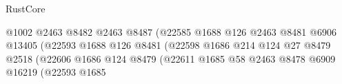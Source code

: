 \begin{lexlean}{RustCore}
\begin{coremodule}
                                                              @1002
                                                              @2463
                                                              @8482
                                                              @2463
                                                              @8487
                                                              (@22585
                                                                @1688
                                                                @126
                                                                @2463
                                                                @8481
                                                                @6906
                                                                @13405
                                                                (@22593
                                                                  @1688
                                                                  @126
                                                                  @8481
                                                                  (@22598
                                                                    @1686
                                                                    @214
                                                                    @124
                                                                    @27
                                                                    @8479
                                                                    @2518
                                                                    (@22606
                                                                      @1686
                                                                      @124
                                                                      @8479
                                                                      (@22611
                                                                        @1685
                                                                        @58
                                                                        @2463
                                                                        @8478
                                                                        @6909
                                                                        @16219
                                                                        (@22593
                                                                          @1685

\end{coremodule}
\end{lexlean}
